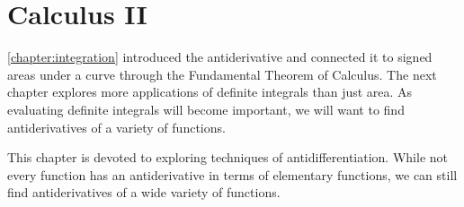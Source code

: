 \part{Calculus II}




\autoref{chapter:integration} introduced the antiderivative and connected it to signed areas under a curve through the Fundamental Theorem of Calculus. The next chapter explores more applications of definite integrals than just area. As evaluating definite integrals will become important, we will want to find antiderivatives of a variety of functions.

This chapter is devoted to exploring techniques of antidifferentiation. While not every function has an antiderivative in terms of elementary functions,
we can still find antiderivatives of a wide variety of functions.



















%





